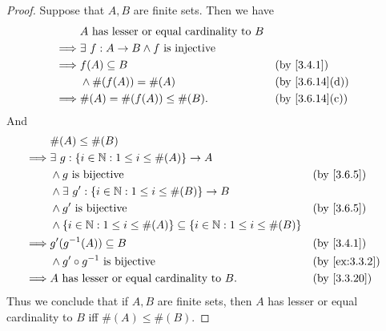 \begin{proof}
  Suppose that \(A, B\) are finite sets.
  Then we have
  \begin{align*}
             & A \text{ has lesser or equal cardinality to } B                                     \\
    \implies & \exists\ f : A \to B \land f \text{ is injective}                                   \\
    \implies & f(A) \subseteq B                                  &  & \text{(by \cref{3.4.1})}     \\
             & \land \#(f(A)) = \#(A)                            &  & \text{(by \cref{3.6.14}(d))} \\
    \implies & \#(A) = \#(f(A)) \leq \#(B).                      &  & \text{(by \cref{3.6.14}(c))}
  \end{align*}
  And
  \begin{align*}
             & \#(A) \leq \#(B)                                                                                                       \\
    \implies & \exists\ g : \{i \in \N : 1 \leq i \leq \#(A)\} \to A                                                                  \\
             & \land g \text{ is bijective}                                                          &  & \text{(by \cref{3.6.5})}    \\
             & \land \exists\ g' : \{i \in \N : 1 \leq i \leq \#(B)\} \to B                                                           \\
             & \land g' \text{ is bijective}                                                         &  & \text{(by \cref{3.6.5})}    \\
             & \land \{i \in \N : 1 \leq i \leq \#(A)\} \subseteq \{i \in \N : 1 \leq i \leq \#(B)\}                                  \\
    \implies & g'(g^{-1}(A)) \subseteq B                                                             &  & \text{(by \cref{3.4.1})}    \\
             & \land g' \circ g^{-1} \text{ is bijective}                                            &  & \text{(by \cref{ex:3.3.2})} \\
    \implies & A \text{ has lesser or equal cardinality to } B.                                      &  & \text{(by \cref{3.3.20})}
  \end{align*}
  Thus we conclude that if \(A, B\) are finite sets, then \(A\) has lesser or equal cardinality to \(B\) iff \(\#(A) \leq \#(B)\).
\end{proof}

